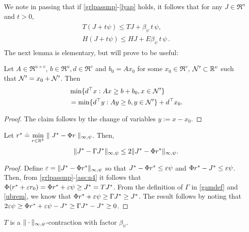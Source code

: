 We note in passing that if \cref{grlpassmp}-\eqref{lyap} holds, it follows that for any $J\in \Re^n$ and $t>0$,
\begin{align}\label{eq:psilin}
\begin{split}
T(J+ t \psi ) \le TJ + \beta_{\psi}\,t\,  \psi,\\
H(J+ t \psi ) \le HJ + E \beta_{\psi}\,t\,  \psi\,.
\end{split}
\end{align}
\fi
%
The next lemma is elementary, but will prove to be useful:
\begin{lemma}\label{lpsol}
Let $A\in \Re^{u\times v}$, $b\in \Re^u,d\in \Re^v$ and $b_0=Ax_0$ for
some $x_0 \in \Re^v$, $\mathcal{N}' \subset \mathbb{R}^v$ such that $\mathcal{N}' =x_0+ \mathcal{N}'$. Then
\begin{align}
&\min\{d^\top x:Ax\geq b+b_0, x\in \mathcal{N}'\} \nonumber\\
&=\min\{d^\top y:Ay \geq b, y \in \mathcal{N}' \}+d^\top x_0.
\end{align}
\end{lemma}
\begin{proof}
The claim follows by the change of variables $y := x-x_0$.
\end{proof}
\noindent 
\begin{lemma}\label{bestbndmn}
Let $r^*\doteq\underset{r\in \mathbb{R}^k}{\min}\parallel J^*-\Phi r\parallel_{\infty,\psi}$. Then,
\begin{align}
\|J^*-\Gamma J^*\|_{\infty,\psi}\leq 2 \|J^*-\Phi r^*\|_{\infty,\psi}.
\end{align}
\end{lemma}
\begin{proof}
Define $\varepsilon = \|J^* - \Phi r^*\|_{\infty,\psi}$ so that
$ J^*-\Phi r^* \le \varepsilon \psi$ and $\Phi r^* - J^*\le \varepsilon \psi$. Then, from \cref{grlpassmp}-\eqref{ass:n4} it follows that $\Phi( r^* + \varepsilon r_0 ) = \Phi r^* + \varepsilon \psi \ge J^* = T J^*$. From the definition of $\Gamma$ in \eqref{gamdef} and \cref{ubrem}, we know that $\Phi r^*+\varepsilon \psi \geq \Gamma J^*\geq J^*$. The result follows by noting that $2\varepsilon\psi\geq \Phi r^*+\varepsilon\psi -J^*\geq \Gamma J^*-J^*\geq 0$.
\end{proof}



\begin{corollary}\label{tmaxnormmn}
$T$ is a $\|\cdot\|_{\infty,\psi}$-contraction with factor $\beta_{\psi}$.
\end{corollary}

